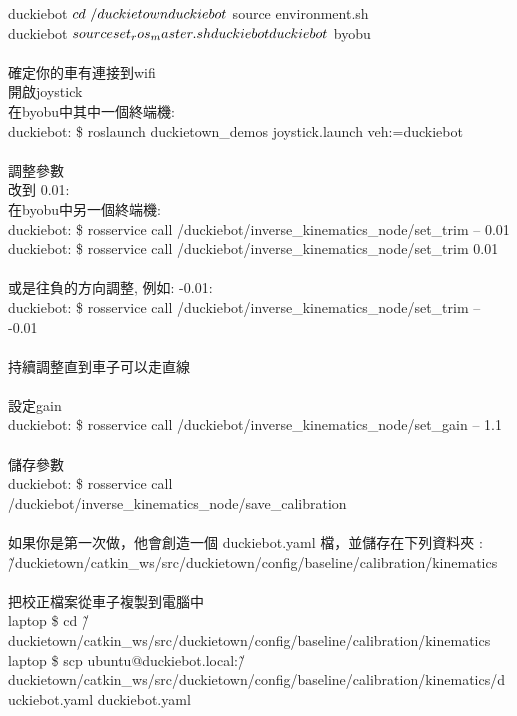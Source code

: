 \documentclass{article}
\begin{document}
duckiebot $ cd ~/duckietown
\\duckiebot $ source environment.sh
\\duckiebot $ source set_ros_master.sh duckiebot
\\duckiebot $ byobu
\\
\\確定你的車有連接到wifi
\\開啟joystick
\\在byobu中其中一個終端機:
\\duckiebot: \$ roslaunch duckietown\_demos joystick.launch veh:=duckiebot
\\
\\調整參數
\\改到 0.01:
\\在byobu中另一個終端機:
\\duckiebot: \$ rosservice call /duckiebot/inverse\_kinematics\_node/set\_trim -- 0.01 
\\duckiebot: \$  rosservice call /duckiebot/inverse\_kinematics\_node/set\_trim 0.01 
\\
\\或是往負的方向調整, 例如: -0.01:
\\duckiebot: \$ rosservice call /duckiebot/inverse\_kinematics\_node/set\_trim -- -0.01 
\\
\\持續調整直到車子可以走直線
\\
\\設定gain
\\duckiebot: \$ rosservice call /duckiebot/inverse\_kinematics\_node/set\_gain -- 1.1 
\\
\\儲存參數
\\duckiebot: \$ rosservice call /duckiebot/inverse\_kinematics\_node/save\_calibration 
\\
\\如果你是第一次做，他會創造一個 duckiebot.yaml 檔，並儲存在下列資料夾 :
\\\~/duckietown/catkin\_ws/src/duckietown/config/baseline/calibration/kinematics
\\
\\把校正檔案從車子複製到電腦中
\\laptop \$ cd \~/duckietown/catkin\_ws/src/duckietown/config/baseline/calibration/kinematics
\\laptop \$ scp ubuntu@duckiebot.local:\~/duckietown/catkin\_ws/src/duckietown/config/baseline/calibration/kinematics/duckiebot.yaml duckiebot.yaml
\end{document}

